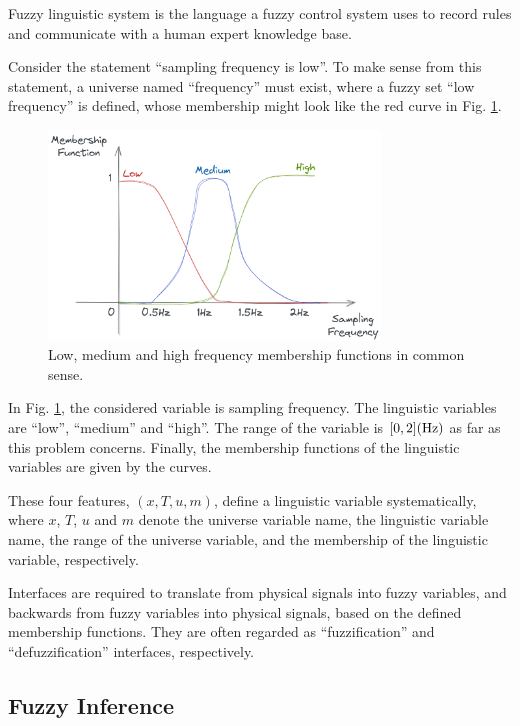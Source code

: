 Fuzzy linguistic system is the language a fuzzy control system uses to record rules and communicate with a human expert knowledge base.

Consider the statement ``sampling frequency is low''. To make sense from this statement, a universe named ``frequency'' must exist, where a fuzzy set ``low frequency'' is defined, whose membership might look like the red curve in Fig. \ref{ch:fcs:fig:explinguistic1}.

\begin{figure}
	\centering
	\includegraphics[width=250pt]{chapters/ch-fuzzy-control-system/figures/explinguistic1.png}
	\caption{Low, medium and high frequency membership functions in common sense.}
	\label{ch:fcs:fig:explinguistic1}
\end{figure}

In Fig. \ref{ch:fcs:fig:explinguistic1}, the considered variable is sampling frequency. The linguistic variables are ``low'', ``medium'' and ``high''. The range of the variable is $[0, 2] (\textup{Hz})$ as far as this problem concerns. Finally, the membership functions of the linguistic variables are given by the curves.

These four features, $(x, T, u, m)$, define a linguistic variable systematically, where $x$, $T$, $u$ and $m$ denote the universe variable name, the linguistic variable name, the range of the universe variable, and the membership of the linguistic variable, respectively.

Interfaces are required to translate from physical signals into fuzzy variables, and backwards from fuzzy variables into physical signals, based on the defined membership functions. They are often regarded as ``fuzzification'' and ``defuzzification'' interfaces, respectively.

\subsection{Fuzzy Inference}

